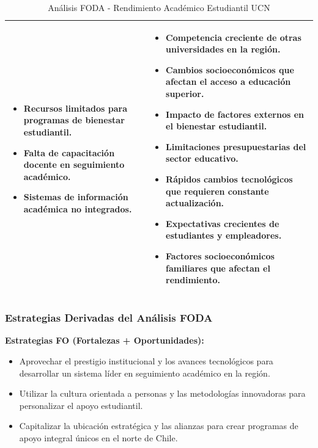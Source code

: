 \documentclass[12pt,letterpaper]{report}
\begin{document}
\begin{table}[H]
\begin{tabular}{|p{}|p{}|}
\begin{itemize}
            \item Recursos limitados para programas de bienestar estudiantil.
            \item Falta de capacitación docente en seguimiento académico.
            \item Sistemas de información académica no integrados.
        \end{itemize} & 
        \begin{itemize}
            \item Competencia creciente de otras universidades en la región.
            \item Cambios socioeconómicos que afectan el acceso a educación superior.
            \item Impacto de factores externos en el bienestar estudiantil.
            \item Limitaciones presupuestarias del sector educativo.
            \item Rápidos cambios tecnológicos que requieren constante actualización.
            \item Expectativas crecientes de estudiantes y empleadores.
            \item Factores socioeconómicos familiares que afectan el rendimiento.
        \end{itemize} \\
        \hline
    \end{tabular}
    \caption{Análisis FODA - Rendimiento Académico Estudiantil UCN}
\end{table}

\subsubsection{Estrategias Derivadas del Análisis FODA}

\textbf{Estrategias FO (Fortalezas + Oportunidades):}
\begin{itemize}
    \item Aprovechar el prestigio institucional y los avances tecnológicos para desarrollar un sistema líder en seguimiento académico en la región.
    \item Utilizar la cultura orientada a personas y las metodologías innovadoras para personalizar el apoyo estudiantil.
    \item Capitalizar la ubicación estratégica y las alianzas para crear programas de apoyo integral únicos en el norte de Chile.
\end{itemize}
\end{document}
